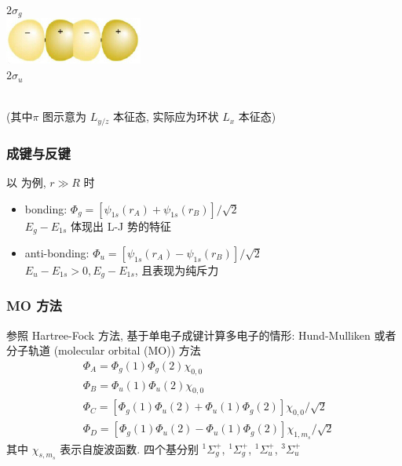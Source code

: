 \documentclass[10pt,a4paper,twocolumn]{article} %
\numberwithin{equation}{section} %
\begin{document}
\begin{itemize}
\begin{itemize}
\begin{minipage}[c]{0.4\linewidth}
			$2\sigma_g$\\
			\includegraphics[width=0.9\linewidth]{sigmau.jpg}\\
			$2\sigma_u$
		\end{minipage}\\
		(其中$\pi$ 图示意为 $L_{y/z}$ 本征态, 实际应为环状 $L_x$ 本征态)
	\end{itemize}
\end{itemize}
\subsubsection{成键与反键} %
\label{ssub:bonding_and_antibonding}
以 为例, $r\gg R$ 时
\begin{itemize}
	\item bonding: $\Phi_g = [\psi_{1s}(r_A) + \psi_{1s}(r_B)]/\sqrt{2}$\\
	$E_g - E_{1s}$ 体现出 L-J 势的特征
	\item anti-bonding: $\Phi_u = [\psi_{1s}(r_A) - \psi_{1s}(r_B)]/\sqrt{2}$\\
	$E_u - E_{1s} > 0, E_g - E_{1s}$, 且表现为纯斥力
\end{itemize}
\subsubsection{MO 方法} %
\label{ssub:mo_method}
参照 Hartree-Fock 方法, 基于单电子成键计算多电子的情形: Hund-Mulliken 或者
分子轨道 (molecular orbital (MO)) 方法
\begin{align}
	&\Phi_A = \Phi_g(1)\Phi_g(2)\chi_{0,0}\\
	&\Phi_B = \Phi_u(1)\Phi_u(2)\chi_{0,0}\\
	&\Phi_C = [\Phi_g(1)\Phi_u(2) + \Phi_u(1)\Phi_g(2)]\chi_{0,0}/\sqrt 2\\
	&\Phi_D = [\Phi_g(1)\Phi_u(2) - \Phi_u(1)\Phi_g(2)]\chi_{1,m_s}/\sqrt 2
\end{align}
其中 $\chi_{s,m_s}$ 表示自旋波函数. 四个基分别 $^1\Sigma^+_g$, $^1\Sigma^+_g$, 
$^1\Sigma^+_u$, $^3\Sigma^+_u$
\end{document}
